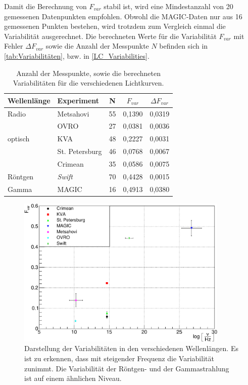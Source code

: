 Damit die Berechnung von $F_{var}$ stabil ist, wird eine Mindestanzahl von 20 gemessenen Datenpunkten empfohlen.
Obwohl die MAGIC-Daten nur aus 16 gemessenen Punkten bestehen, wird trotzdem zum Vergleich einmal die Variabilität ausgerechnet.
Die berechneten Werte für die Variabilität $F_{var}$ mit Fehler $\Delta F_{var}$ sowie die Anzahl der Messpunkte $N$ befinden sich in \autoref{tab:Variabilitäten}, bzw. in \autoref{LC_Variabilities}.


\begin{table}[!h]
\centering
\caption{Anzahl der Messpunkte, sowie die berechneten Variabilitäten für die verschiedenen Lichtkurven.}
\label{tab:Variabilitäten}
\begin{tabular}{llccc}
  \toprule
  Wellenlänge & Experiment & N & $F_{var}$ & $\Delta F_{var}$\\
  \midrule
  \midrule
  Radio & Metsahovi & 55 & 0,1390 & 0,0319 \\
  &OVRO & 27 & 0,0381 & 0,0036 \\
  optisch &KVA & 48 & 0,2227 & 0,0031 \\
  &St. Petersburg & 46 & 0,0768 & 0,0067 \\
  &Crimean & 35 & 0,0586 & 0,0075 \\
  Röntgen & \textit{Swift} & 70 & 0,4428 & 0,0015\\
  Gamma & MAGIC & 16 & 0,4913 & 0,0380 \\
  \bottomrule
\end{tabular}
\end{table}


\begin{figure}
    \centering
    \includegraphics[width=0.9\textwidth]{./Plots/05_MWL/PlotVariabilities.pdf}
    \caption{Darstellung der Variabilitäten in den verschiedenen Wellenlängen.
    Es ist zu erkennen, dass mit steigender Frequenz die Variabilität zunimmt.
    Die Variabilität der Röntgen- und der Gammastrahlung ist auf einem ähnlichen Niveau.}
    \label{LC_Variabilities}
\end{figure}

